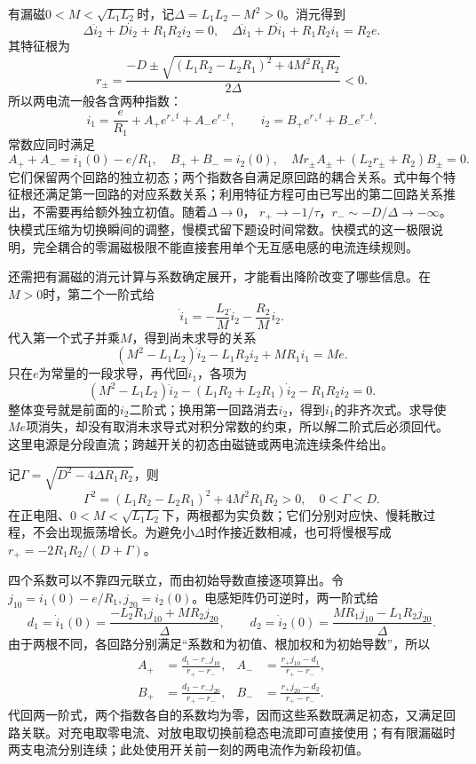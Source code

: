 \documentclass[UTF8,fontset=fandol,a4paper,11pt]{ctexart}
\begin{document}
有漏磁$0<M<\sqrt{L_1L_2}$时，记$\Delta=L_1L_2-M^2>0$。消元得到
\[
 \Delta\ddot i_2+D\dot i_2+R_1R_2i_2=0,\quad
 \Delta\ddot i_1+D\dot i_1+R_1R_2i_1=R_2 e.
\]
其特征根为
\[
 r_\pm=\frac{-D\pm\sqrt{(L_1R_2-L_2R_1)^2+4M^2R_1R_2}}{2\Delta}<0.
\]
所以两电流一般各含两种指数：
\[
 i_1=\frac e{R_1}+A_+e^{r_+t}+A_-e^{r_-t},\qquad
 i_2=B_+e^{r_+t}+B_-e^{r_-t}.
\]
常数应同时满足
\[
 A_++A_-=i_1(0)-e/R_1,\quad B_++B_-=i_2(0),\quad
 Mr_\pm A_\pm+(L_2r_\pm+R_2)B_\pm=0.
\]
它们保留两个回路的独立初态；两个指数各自满足原回路的耦合关系。式中每个特征根还满足第一回路的对应系数关系；利用特征方程可由已写出的第二回路关系推出，不需要再给额外独立初值。随着$\Delta\to0$，
$r_+\to-1/\tau$，$r_-\sim-D/\Delta\to-\infty$。快模式压缩为切换瞬间的调整，慢模式留下题设时间常数。快模式的这一极限说明，完全耦合的零漏磁极限不能直接套用单个无互感电感的电流连续规则。


还需把有漏磁的消元计算与系数确定展开，才能看出降阶改变了哪些信息。在$M>0$时，第二个一阶式给
\[
\dot i_1=-\frac{L_2}{M}\dot i_2-\frac{R_2}{M}i_2.
\]
代入第一个式子并乘$M$，得到尚未求导的关系
\[
(M^2-L_1L_2)\dot i_2-L_1R_2i_2+MR_1i_1=Me.
\]
只在$e$为常量的一段求导，再代回$\dot i_1$，各项为
\[
(M^2-L_1L_2)\ddot i_2-(L_1R_2+L_2R_1)\dot i_2-R_1R_2i_2=0.
\]
整体变号就是前面的$i_2$二阶式；换用第一回路消去$i_2$，得到$i_1$的非齐次式。求导使$Me$项消失，却没有取消未求导式对积分常数的约束，所以解二阶式后必须回代。这里电源是分段直流；跨越开关的初态由磁链或两电流连续条件给出。

记$\Gamma=\sqrt{D^2-4\Delta R_1R_2}$，则
\[
\Gamma^2=(L_1R_2-L_2R_1)^2+4M^2R_1R_2>0,
\quad 0<\Gamma<D.
\]
在正电阻、$0<M<\sqrt{L_1L_2}$下，两根都为实负数；它们分别对应快、慢耗散过程，不会出现振荡增长。为避免小$\Delta$时作接近数相减，也可将慢根写成$r_+=-2R_1R_2/(D+\Gamma)$。

四个系数可以不靠四元联立，而由初始导数直接逐项算出。令$j_{10}=i_1(0)-e/R_1,j_{20}=i_2(0)$。电感矩阵仍可逆时，两一阶式给
\[
d_1=\dot i_1(0)=\frac{-L_2R_1j_{10}+MR_2j_{20}}{\Delta},\qquad
d_2=\dot i_2(0)=\frac{MR_1j_{10}-L_1R_2j_{20}}{\Delta}.
\]
由于两根不同，各回路分别满足“系数和为初值、根加权和为初始导数”，所以
\[
\begin{aligned}
A_+&=\frac{d_1-r_-j_{10}}{r_+-r_-},&
A_-&=\frac{r_+j_{10}-d_1}{r_+-r_-},\\
B_+&=\frac{d_2-r_-j_{20}}{r_+-r_-},&
B_-&=\frac{r_+j_{20}-d_2}{r_+-r_-}.
\end{aligned}
\]
代回两一阶式，两个指数各自的系数均为零，因而这些系数既满足初态，又满足回路关联。对充电取零电流、对放电取切换前稳态电流即可直接使用；有有限漏磁时两支电流分别连续；此处使用开关前一刻的两电流作为新段初值。
\end{document}
